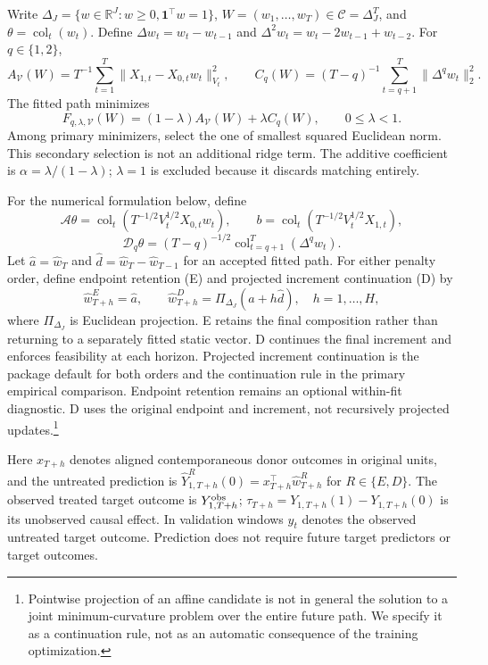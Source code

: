 \documentclass[11pt]{article}
\newcommand{\simplex}{\Delta_J}
\begin{document}
Write $\simplex=\{w\in\mathbb R^J:w\geq0,\mathbf1^\top w=1\}$,
$W=(w_1,\ldots,w_T)\in\mathcal C=\simplex^T$, and
$\theta=\operatorname{col}_t(w_t)$. Define
$\Delta w_t=w_t-w_{t-1}$ and
$\Delta^2w_t=w_t-2w_{t-1}+w_{t-2}$. For $q\in\{1,2\}$,
\[
 A_{\mathcal V}(W)=T^{-1}\sum_{t=1}^T
       \|X_{1,t}-X_{0,t}w_t\|_{V_t}^2,\qquad
 C_q(W)=(T-q)^{-1}\sum_{t=q+1}^T\|\Delta^q w_t\|_2^2.
\]
The fitted path minimizes
\[
 F_{q,\lambda,\mathcal V}(W)=(1-\lambda)A_{\mathcal V}(W)
                      +\lambda C_q(W),\qquad 0\leq\lambda<1.
\]
Among primary minimizers, select the one of smallest squared Euclidean
norm. This secondary selection is not an additional ridge term.
The additive coefficient is $\alpha=\lambda/(1-\lambda)$;
$\lambda=1$ is excluded because it discards matching entirely.

For the numerical formulation below, define
\[
 \mathcal A\theta=\operatorname{col}_t
       (T^{-1/2}V_t^{1/2}X_{0,t}w_t),\qquad
 b=\operatorname{col}_t(T^{-1/2}V_t^{1/2}X_{1,t}),
\]
\[
 \mathcal D_q\theta=(T-q)^{-1/2}
       \operatorname{col}_{t=q+1}^T(\Delta^q w_t).
\]
Let $\widehat a=\widehat w_T$ and
$\widehat d=\widehat w_T-\widehat w_{T-1}$ for an accepted fitted path.
For either penalty order, define endpoint retention (E) and projected
increment continuation (D) by
\begin{equation}\label{eq:continuation}
 \widehat w^E_{T+h}=\widehat a,\qquad
 \widehat w^D_{T+h}=\Pi_{\simplex}(\widehat a+h\widehat d),
 \quad h=1,\ldots,H,
\end{equation}
where $\Pi_{\simplex}$ is Euclidean projection. E retains the final
composition rather than returning to a separately fitted static vector.
D continues the final increment and enforces feasibility at each horizon.
Projected increment continuation is the package default for both orders
and the continuation rule in the primary empirical comparison. Endpoint
retention remains an optional within-fit diagnostic.
D uses the original endpoint and increment, not recursively projected
updates.\footnote{Pointwise projection of an affine candidate is not in
general the solution to a joint minimum-curvature problem over the entire
future path. We specify it as a continuation rule, not as an automatic
consequence of the training optimization.}


Here $x_{T+h}$ denotes aligned contemporaneous donor outcomes in original
units, and the untreated prediction is
$\widehat Y^R_{1,T+h}(0)=x_{T+h}^\top\widehat w^R_{T+h}$ for
$R\in\{E,D\}$. The observed treated target outcome is
$Y^{\rm obs}_{1,T+h}$; $\tau_{T+h}=Y_{1,T+h}(1)-Y_{1,T+h}(0)$ is its
unobserved causal effect. In validation windows $y_t$ denotes the observed
untreated target outcome. Prediction does not require future target
predictors or target outcomes.
\end{document}
